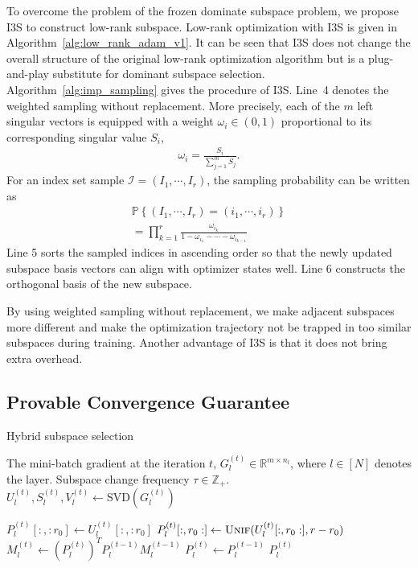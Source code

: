 To overcome the problem of the frozen dominate subspace problem, we propose I3S to construct low-rank subspace. Low-rank optimization with I3S is given in Algorithm~\ref{alg:low_rank_adam_v1}.  
It can be seen that I3S does not change the overall structure of the original low-rank optimization algorithm but is a plug-and-play substitute for dominant subspace selection. Algorithm~\ref{alg:imp_sampling} gives the procedure of I3S. Line~4 denotes the weighted sampling without replacement. More precisely, each of the $m$ left singular vectors is equipped with a weight $\omega_i \in (0, 1)$ proportional to its corresponding singular value $S_i$,
\begin{align*}
    \omega_i = \frac{S_i}{\sum_{j=1}^{m}S_j}.
\end{align*}
For an index set sample $\mathcal{I}=\left(I_1, \cdots, I_r\right)$, the sampling probability can be written as 
\begin{align*}
    \mathbb{P}\left \{ \left ( I_1,\cdots ,I_r \right )= \left ( i_1,\cdots ,i_r \right ) \right \} \\=\prod_{k=1}^{r}\frac{\omega_{i_k}}{1-\omega_{i_1}-\cdots-\omega_{i_{k-1}}}  
\end{align*}
Line 5 sorts the sampled indices in ascending order so that the newly updated subspace basis vectors can align with optimizer states well. Line 6 constructs the orthogonal basis of the new subspace.

By using weighted sampling without replacement, we make adjacent subspaces more different and make the optimization trajectory not be trapped in too similar subspaces during training. 
Another advantage of I3S is that it does not bring extra overhead. 


\subsection{Provable Convergence Guarantee}\label{sec:3.3}

\begin{algorithm}[!ht]
   \caption{Hybrid subspace selection}
   \label{alg:hybrid_sampling}
 \begin{algorithmic}[1]
     The mini-batch gradient at the iteration $t$, $G_l^{(t)} \in \mathbb{R}^{m \times n_l}$, where $l \in [N]$ denotes the layer. Subspace change frequency $\tau \in \mathbb{Z}_+$.\\
   \STATE $U_l^{(t)}, S_l^{(t)}, V_l^{(t)} \gets \text{SVD}(G_l^{(t)})$
   
   \STATE $P_l^{(t)}[:,:r_0] \gets U_l^{(t)}[:, :r_0]$ \hfill {}
   \STATE $P_l^{(t)}[:,r_0:] \gets \textsc{Unif}(U_l^{(t)}[:, r_0:], r-r_0)$ \hfill {}
   \STATE $M_l^{(t)} \gets (P_l^{(t)})^T P_l^{(t-1)} M_l^{(t-1)}$ \hfill {}
   \ELSE
   \STATE $P_l^{(t)} \gets P_l^{(t-1)}$ \hfill {}
   \ENDIF
    $P_l^{(t)}$
 \end{algorithmic}
\end{algorithm}

